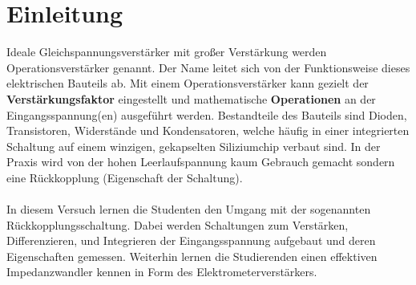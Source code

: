 

\chapter{Einleitung}
\label{chap:einleitung}

Ideale Gleichspannungsverstärker mit großer Verstärkung werden Operationsverstärker genannt. Der Name leitet sich von der Funktionsweise dieses elektrischen Bauteils ab. Mit einem Operationsverstärker kann gezielt der \textbf{Verstärkungsfaktor} eingestellt und mathematische \textbf{Operationen} an der Eingangsspannung(en) ausgeführt werden. Bestandteile des Bauteils sind Dioden, Transistoren, Widerstände und Kondensatoren, welche häufig in einer integrierten Schaltung auf einem winzigen, gekapselten Siliziumchip verbaut sind. In der Praxis wird von der hohen Leerlaufspannung kaum Gebrauch gemacht sondern eine Rückkopplung (Eigenschaft der Schaltung). \\
 \\
In diesem Versuch lernen die Studenten den Umgang mit der sogenannten Rückkopplungsschaltung. Dabei werden Schaltungen zum Verstärken, Differenzieren, und Integrieren der Eingangsspannung aufgebaut und deren Eigenschaften gemessen. Weiterhin lernen die Studierenden einen effektiven Impedanzwandler kennen in Form des Elektrometerverstärkers.